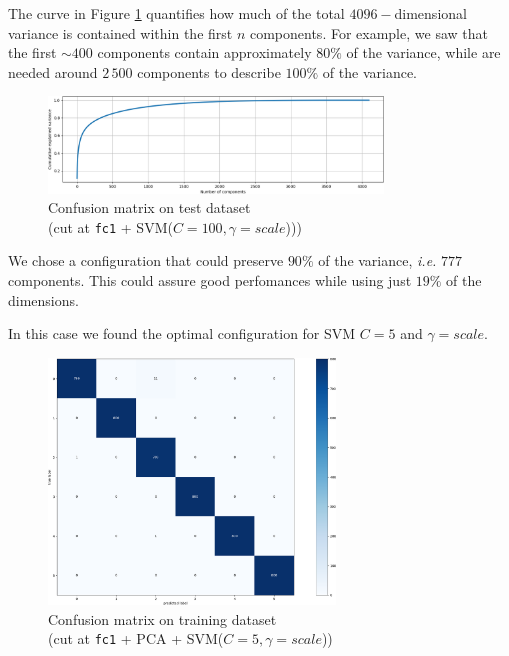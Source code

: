 \documentclass[compsoc]{IEEEtran}
\begin{document}
The curve in Figure \ref{fig:var1} quantifies how much of the total $4096-$dimensional variance is contained within the first $n$ components. For example, we saw that the first ${\sim400}$ components contain approximately $80\%$ of the variance, while are needed around $2\,500$ components to describe $100\%$ of the variance.
\begin{figure}[ht!]
\centering                                                                        
\includegraphics[width=3.5in]{../images/var-1.png}
\captionsetup{justification=centering}                                                                                         
\caption{Confusion matrix on test dataset \\ (cut at \texttt{fc1} + SVM($C=100, \gamma=scale$)))}
\label{fig:var1}                                                                                                                               
\end{figure}
We chose a configuration that could preserve $90\%$ of the variance, \emph{i.e.} $777$ components. This could assure good perfomances while using just $19\%$ of the dimensions.\par
In this case we found the optimal configuration for SVM $C=5$ and $\gamma=scale$.

\begin{figure}[ht!]
\centering                                                                        
\includegraphics[width=3in]{../images/cm1-pca-train.png}
\captionsetup{justification=centering}                                                                                         
\caption{Confusion matrix on training dataset \\ (cut at \texttt{fc1} + PCA + SVM($C=5, \gamma=scale$))}
\label{fig:cm1-pca-train}                                                                                                                               
\end{figure}
\end{document}
